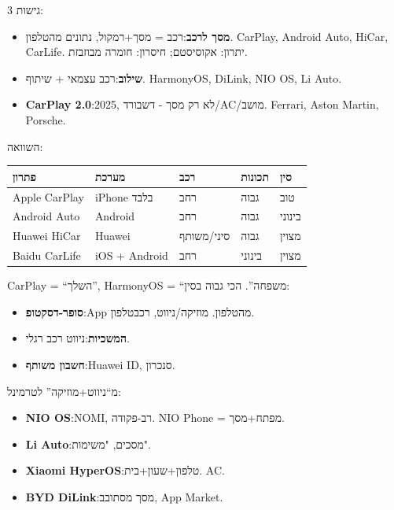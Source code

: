 


3 גישות:

\begin{itemize}
  \item \textbf{מסך לרכב}:רכב = מסך+רמקול, נתונים מהטלפון. CarPlay, Android Auto, HiCar, CarLife. יתרון: אקוסיסטם; חיסרון: חומרה מבוזבזת.
  \item \textbf{שילוב}:רכב עצמאי + שיתוף. HarmonyOS, DiLink, NIO OS, Li Auto.
  \item \textbf{CarPlay 2.0}:2025, לא רק מסך - דשבורד/AC/מושב. Ferrari, Aston Martin, Porsche.
\end{itemize}


השוואה:

\begin{center}
\begin{tabularx}{\linewidth}{|X|X|X|X|X|}
\hline
\textbf{פתרון} & \textbf{מערכת} & \textbf{רכב} & \textbf{תכונות} & \textbf{סין} \tabularnewline
\hline
Apple CarPlay & iPhone בלבד & רחב & גבוה & טוב \tabularnewline
Android Auto & Android & רחב & גבוה & בינוני \tabularnewline
Huawei HiCar & Huawei & סיני/משותף & גבוה & מצוין \tabularnewline
Baidu CarLife & iOS + Android & רחב & בינוני & מצוין \tabularnewline
\hline
\end{tabularx}
\end{center}


CarPlay = “השלך”, HarmonyOS = “משפחה”. הכי גבוה בסין:

\begin{itemize}
  \item \textbf{סופר-דסקטופ}:App מהטלפון. מוזיקה/ניווט, רכבטלפון.
  \item \textbf{המשכיות}:ניווט רכב רגלי.
  \item \textbf{חשבון משותף}:Huawei ID, סנכרון.
\end{itemize}


מ“ניווט+מוזיקה” לטרמינל:

\begin{itemize}
  \item \textbf{NIO OS}:NOMI, רב-פקודה. NIO Phone = מפתח+מסך.
  \item \textbf{Li Auto}:מסכים, "משימות".
  \item \textbf{Xiaomi HyperOS}:טלפון+שעון+בית. AC.
  \item \textbf{BYD DiLink}:מסך מסתובב, App Market.
\end{itemize}

